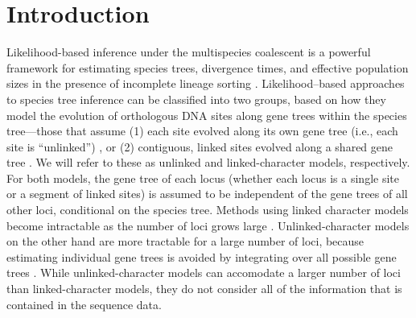 \section{Introduction}




Likelihood-based inference under the multispecies coalescent is a powerful 
framework for estimating species trees,  divergence times, and  effective 
population sizes in the presence of incomplete lineage sorting 
\citep{xuChallengesSpeciesTree2016}. Likelihood--based approaches to species 
tree inference can be classified into two groups, based on how they model the 
evolution of orthologous DNA sites along gene trees within the species 
tree---those that assume (1) each site evolved along its own gene tree 
(i.e., each site is ``unlinked'') 
\citep{bryantInferringSpeciesTrees2012, maioPoMoAlleleFrequencyBased2015}, 
or (2) contiguous, linked sites evolved along a shared gene tree 
\citep{liuSpeciesTreesGene2007, ogilvieStarBEAST2BringsFaster2017, 
yangBPPProgramSpecies2015}. We will refer to these as unlinked and 
linked-character models, respectively. For both models, the gene tree of each 
locus (whether each locus is a single site or a segment of linked sites) 
is assumed to be independent of the gene 
trees of all other loci, conditional on the species tree. Methods using linked 
character models become intractable as the number of loci grows large 
\citep{bryantInferringSpeciesTrees2012}. Unlinked-character models on the other 
hand are more tractable for a large number of loci, because  estimating 
individual gene trees is avoided by integrating over all possible gene trees 
\citep{bryantInferringSpeciesTrees2012}. While unlinked-character models can 
accomodate a larger number of loci than linked-character models, they do not 
consider all of the information that is contained in the sequence data. 

